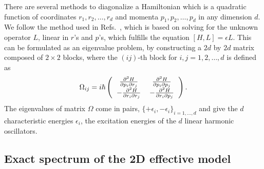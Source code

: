 \documentclass[aps,floatfix,twocolumn,showpacs,10pt,nofootinbib]{revtex4-1}
\begin{document}
There are several methods to diagonalize a Hamiltonian which is a quadratic function of coordinates $r_1,r_2, \ldots, r_d$ and  momenta $p_1,p_2, \ldots, p_d$ in any dimension $d$.\cite{rebane1969,davies1985,lin2002} We follow the method used in Refs.~, which is based on solving for the unknown operator $L$, linear in $r$'s and $p$'s, which fulfills the equation $[H,L]=\epsilon L$. This can be formulated as an eigenvalue problem, by constructing a $2d$ by $2d$ matrix composed of $2 \times 2$ blocks, where the $(ij)$-th block for $i,j=1,2,\ldots, d$ is defined as
\begin{equation}
\Omega_{ij}=i \hbar \left(
\begin{tabular}{cccc}
$\frac{\partial^2 H}{\partial p_i \partial r_j}$ & $\frac{\partial^2 H}{\partial p_i \partial p_j}$ \\
$-\frac{\partial^2 H}{\partial r_i \partial r_j}$ & $-\frac{\partial^2 H}{\partial r_i \partial p_j}$ \\
\end{tabular}
\right).
\end{equation}
The eigenvalues of matrix $\Omega$ come in pairs, $\{+\epsilon_i,-\epsilon_i\}_{i = 1, \ldots, d}$ and give the $d$ characteristic energies $\epsilon_i$, the excitation energies of the $d$ linear harmonic oscillators.

\subsection{Exact spectrum of the 2D effective model}
\end{document}

